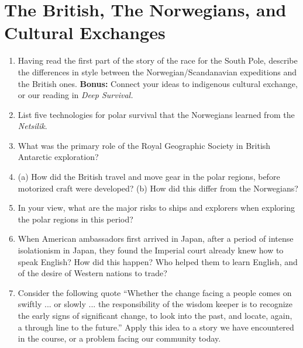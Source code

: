\documentclass[10pt]{article}
\begin{document}
\section{The British, The Norwegians, and Cultural Exchanges}

\begin{enumerate}
\item Having read the first part of the story of the race for the South Pole, describe the differences in style between the Norwegian/Scandanavian expeditions and the British ones. \textbf{Bonus:} Connect your ideas to indigenous cultural exchange, or our reading in \textit{Deep Survival.} \\ \vspace{2cm}
\item List five technologies for polar survival that the Norwegians learned from the \textit{Netsilik}. \\ \vspace{2cm}
\item What was the primary role of the Royal Geographic Society in British Antarctic exploration? \\ \vspace{2cm}
\item (a) How did the British travel and move gear in the polar regions, before motorized craft were developed? (b) How did this differ from the Norwegians? \\ \vspace{2cm}
\item In your view, what are the major risks to ships and explorers when exploring the polar regions in this period? \\ \vspace{2cm}
\item When American ambassadors first arrived in Japan, after a period of intense isolationism in Japan, they found the Imperial court already knew how to speak English?  How did this happen?  Who helped them to learn English, and of the desire of Western nations to trade? \\ \vspace{2cm}
\item Consider the following quote ``Whether the change facing a people comes on swiftly ... or slowly ... the responsibility of the wisdom keeper is to recognize the early signs of significant change, to look into the past, and locate, again, a through line to the future.'' Apply this idea to a story we have encountered in the course, or a problem facing our community today. \\ \vspace{5cm}
\end{enumerate}
\end{document}
